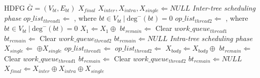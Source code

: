 \begin{algorithm}[t]
{
        \fontsize{8pt}{9pt}\selectfont
    \caption{}
    \begin{algorithmic}[1]
        \Require    HDFG $\bar{G} = (V_{bt}, E_{bt})$
        \Ensure     $X_{final}$
        \State $X_{inter},X_{intra},X_{single}\Leftarrow NULL$       %
         \label{line:interws}
        \Comment \textit{Inter-tree scheduling phase}
        \State $op\_list_{thread1} \Leftarrow$ , where $bt\in V_{bt}\ |\ \textrm{deg}^-(bt) = 0$ 
        \EndIf
        \State $op\_list_{thread2} \Leftarrow$ , where $bt\in V_{bt}\ |\ \textrm{deg}^-(bt) = 0$
        \EndIf
        \State $X_{1} \Leftarrow X_{1}\oplus$ \label{line:intercon}
        \EndWhile \label{line:interwe}
         \label{line:interis}
        \State $bt_{remain} \Leftarrow$ 
        \State Clear $work\_queue_{thread1}$
        \State $bt_{remain} \Leftarrow$ 
        \State Clear $work\_queue_{thread2}$
        \Else
        \State $bt_{remain} \Leftarrow NULL$
        \EndIf \label{line:interie}
            \label{line:intra:ws}
        \Comment \textit{Intra-tree scheduling phase}
        \State $X_{single} \Leftarrow$  $\oplus X_{single}$
        \State $op\_list_{thread1} \Leftarrow$ 
        \State $op\_list_{thread2} \Leftarrow$ 
        \State $X_{body} \Leftarrow X_{body} \oplus$ 
        \State $bt_{remain} \Leftarrow$ 
        \State Clear $work\_queue_{thread1}$
        \State $bt_{remain} \Leftarrow$ 
        \State Clear $work\_queue_{thread2}$
        \Else
        \State $bt_{remain} \Leftarrow NULL$
        \EndIf
        \EndWhile   \label{line:intra:we}
        \State $X_{final} \Leftarrow X_{inter} \oplus X_{intra} \oplus X_{single}$
        \State {}
    \end{algorithmic}%
    \label{alg}
}
\end{algorithm}

